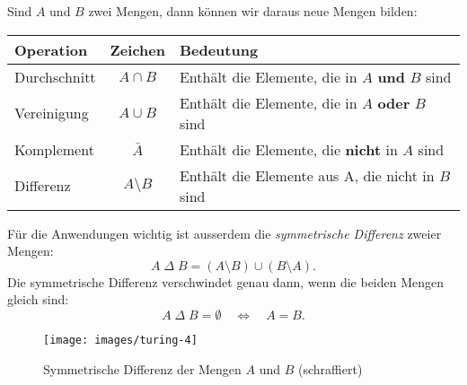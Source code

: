 Sind $A$ und $B$ zwei Mengen, dann können wir daraus neue Mengen
bilden:
\begin{center}
\begin{tabular}{|l|c|l|}
\hline
Operation&Zeichen&Bedeutung\\
\hline
\index{Durchschnitt}%
Durchschnitt&$A\cap B$&Enthält die Elemente, die in $A$ {\bf und} $B$ sind\\
\index{Vereinigung}%
Vereinigung&$A\cup B$&Enthält die Elemente, die in $A$ {\bf oder} $B$ sind\\
\index{Komplement}%
Komplement&$\bar A$&Enthält die Elemente, die {\bf nicht} in $A$ sind\\
\index{Differenz}%
Differenz&$A\setminus B$&Enthält die Elemente aus A, die nicht in $B$ sind\\
\hline
\end{tabular}
\end{center}
%
Für die Anwendungen wichtig ist ausserdem die {\em symmetrische Differenz}
zweier Mengen: 
\[
A{\;\Delta\;}B = (A\setminus B)\cup (B\setminus A).
\]
Die symmetrische Differenz verschwindet genau dann, wenn die beiden
Mengen gleich sind:
\[
A{\;\Delta\;}B = \emptyset
\quad\Leftrightarrow\quad
A=B.
\]
\begin{figure}
\begin{center}
\texttt{[image: images/turing-4]}
\end{center}
\caption{Symmetrische Differenz der Mengen $A$ und $B$ (schraffiert)
\label{symdiff}}
\end{figure}

